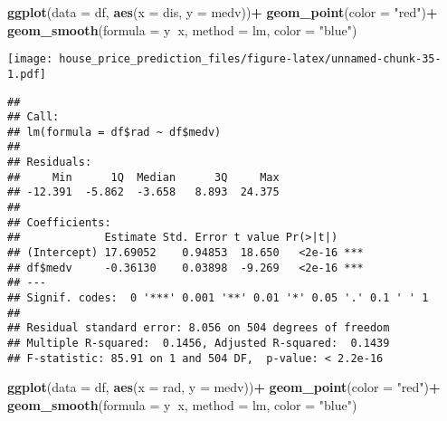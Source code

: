 \documentclass[
]{article}
\newenvironment{Shaded}{\begin{snugshade}}{\end{snugshade}}
\newcommand{\DataTypeTok}[1]{\textcolor[rgb]{0.13,0.29,0.53}{#1}}
\newcommand{\KeywordTok}[1]{\textcolor[rgb]{0.13,0.29,0.53}{\textbf{#1}}}
\newcommand{\NormalTok}[1]{#1}
\newcommand{\OperatorTok}[1]{\textcolor[rgb]{0.81,0.36,0.00}{\textbf{#1}}}
\newcommand{\StringTok}[1]{\textcolor[rgb]{0.31,0.60,0.02}{#1}}
\begin{document}
\begin{Shaded}
\begin{Highlighting}[]
\KeywordTok{ggplot}\NormalTok{(}\DataTypeTok{data =}\NormalTok{ df, }\KeywordTok{aes}\NormalTok{(}\DataTypeTok{x =}\NormalTok{ dis, }\DataTypeTok{y =}\NormalTok{ medv))}\OperatorTok{+}
\StringTok{  }\KeywordTok{geom_point}\NormalTok{(}\DataTypeTok{color =} \StringTok{"red"}\NormalTok{)}\OperatorTok{+}
\StringTok{  }\KeywordTok{geom_smooth}\NormalTok{(}\DataTypeTok{formula =}\NormalTok{ y}\OperatorTok{~}\NormalTok{x, }\DataTypeTok{method =}\NormalTok{ lm, }\DataTypeTok{color =} \StringTok{"blue"}\NormalTok{)}
\end{Highlighting}
\end{Shaded}

\texttt{[image: house\_price\_prediction\_files/figure-latex/unnamed-chunk-35-1.pdf]}

\begin{Shaded}
\end{Shaded}

\begin{verbatim}
## 
## Call:
## lm(formula = df$rad ~ df$medv)
## 
## Residuals:
##     Min      1Q  Median      3Q     Max 
## -12.391  -5.862  -3.658   8.893  24.375 
## 
## Coefficients:
##             Estimate Std. Error t value Pr(>|t|)    
## (Intercept) 17.69052    0.94853  18.650   <2e-16 ***
## df$medv     -0.36130    0.03898  -9.269   <2e-16 ***
## ---
## Signif. codes:  0 '***' 0.001 '**' 0.01 '*' 0.05 '.' 0.1 ' ' 1
## 
## Residual standard error: 8.056 on 504 degrees of freedom
## Multiple R-squared:  0.1456, Adjusted R-squared:  0.1439 
## F-statistic: 85.91 on 1 and 504 DF,  p-value: < 2.2e-16
\end{verbatim}

\begin{Shaded}
\begin{Highlighting}[]
\KeywordTok{ggplot}\NormalTok{(}\DataTypeTok{data =}\NormalTok{ df, }\KeywordTok{aes}\NormalTok{(}\DataTypeTok{x =}\NormalTok{ rad, }\DataTypeTok{y =}\NormalTok{ medv))}\OperatorTok{+}
\StringTok{  }\KeywordTok{geom_point}\NormalTok{(}\DataTypeTok{color =} \StringTok{"red"}\NormalTok{)}\OperatorTok{+}
\StringTok{  }\KeywordTok{geom_smooth}\NormalTok{(}\DataTypeTok{formula =}\NormalTok{ y}\OperatorTok{~}\NormalTok{x, }\DataTypeTok{method =}\NormalTok{ lm, }\DataTypeTok{color =} \StringTok{"blue"}\NormalTok{)}
\end{Highlighting}
\end{Shaded}
\end{document}
